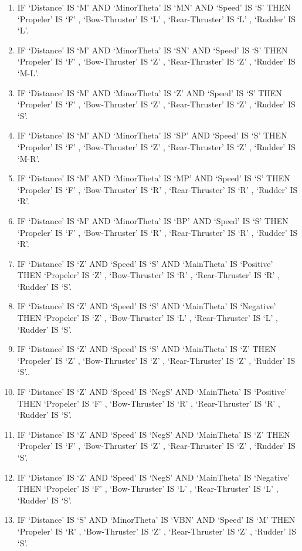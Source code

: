 \begin{enumerate}
\item	IF ‘Distance’ IS  ‘M’  AND  ‘MinorTheta’ IS ‘MN’   AND ‘Speed’ IS ‘S’  THEN ‘Propeler’ IS ‘F’  ,  ‘Bow-Thruster’ IS ‘L’ ,  ‘Rear-Thruster’ IS  ‘L’ ,  ‘Rudder’ IS ‘L’.
\item	IF ‘Distance’ IS  ‘M’  AND  ‘MinorTheta’ IS ‘SN’   AND ‘Speed’ IS ‘S’  THEN ‘Propeler’ IS ‘F’  ,  ‘Bow-Thruster’ IS ‘Z’ ,  ‘Rear-Thruster’ IS  ‘Z’ ,  ‘Rudder’ IS ‘M-L’.
\item	IF ‘Distance’ IS  ‘M’  AND  ‘MinorTheta’ IS ‘Z’   AND ‘Speed’ IS ‘S’  THEN ‘Propeler’ IS ‘F’  ,  ‘Bow-Thruster’ IS ‘Z’ ,  ‘Rear-Thruster’ IS  ‘Z’ ,  ‘Rudder’ IS ‘S’.
\item	IF ‘Distance’ IS  ‘M’  AND  ‘MinorTheta’ IS ‘SP’   AND ‘Speed’ IS ‘S’  THEN ‘Propeler’ IS ‘F’  ,  ‘Bow-Thruster’ IS ‘Z’ ,  ‘Rear-Thruster’ IS  ‘Z’ ,  ‘Rudder’ IS ‘M-R’.
\item	IF ‘Distance’ IS  ‘M’  AND  ‘MinorTheta’ IS ‘MP’   AND ‘Speed’ IS ‘S’  THEN ‘Propeler’ IS ‘F’  ,  ‘Bow-Thruster’ IS ‘R’ ,  ‘Rear-Thruster’ IS  ‘R’ ,  ‘Rudder’ IS ‘R’.
\item	IF ‘Distance’ IS  ‘M’  AND  ‘MinorTheta’ IS ‘BP’   AND ‘Speed’ IS ‘S’  THEN ‘Propeler’ IS ‘F’  ,  ‘Bow-Thruster’ IS ‘R’ ,  ‘Rear-Thruster’ IS  ‘R’ ,  ‘Rudder’ IS ‘R’.
\item	IF ‘Distance’ IS  ‘Z’   AND ‘Speed’ IS ‘S’  AND ‘MainTheta’ IS ‘Positive’ THEN ‘Propeler’ IS ‘Z’ ,  ‘Bow-Thruster’ IS ‘R’  ,  ‘Rear-Thruster’ IS  ‘R’  ,  ‘Rudder’ IS ‘S’.
\item	IF ‘Distance’ IS ‘Z’   AND ‘Speed’ IS ‘S’  AND ‘MainTheta’ IS ‘Negative’  THEN ‘Propeler’ IS ‘Z’ ,  ‘Bow-Thruster’ IS ‘L’  ,  ‘Rear-Thruster’ IS  ‘L’  ,  ‘Rudder’ IS ‘S’.
\item	IF ‘Distance’ IS ‘Z’   AND ‘Speed’ IS ‘S’  AND ‘MainTheta’ IS ‘Z’  THEN ‘Propeler’ IS ‘Z’ ,  ‘Bow-Thruster’ IS ‘Z’  ,  ‘Rear-Thruster’ IS  ‘Z’  ,  ‘Rudder’ IS ‘S’..
\item	IF ‘Distance’ IS ‘Z’   AND ‘Speed’ IS ‘NegS’  AND ‘MainTheta’ IS ‘Positive’  THEN ‘Propeler’ IS ‘F’ ,  ‘Bow-Thruster’ IS ‘R’  ,  ‘Rear-Thruster’ IS  ‘R’  ,  ‘Rudder’ IS ‘S’.
\item	IF ‘Distance’ IS ‘Z’   AND ‘Speed’ IS ‘NegS’   AND ‘MainTheta’ IS ‘Z’  THEN ‘Propeler’ IS ‘F’ ,  ‘Bow-Thruster’ IS ‘Z’  ,  ‘Rear-Thruster’ IS  ‘Z’  ,  ‘Rudder’ IS ‘S’. 
\item	IF ‘Distance’ IS ‘Z’   AND ‘Speed’ IS ‘NegS’   AND ‘MainTheta’ IS ‘Negative’  THEN ‘Propeler’ IS ‘F’ ,  ‘Bow-Thruster’ IS ‘L’  ,  ‘Rear-Thruster’ IS  ‘L’  ,  ‘Rudder’ IS ‘S’. 
\item	IF ‘Distance’ IS ‘S’   AND ‘MinorTheta’ IS ‘VBN’  AND ‘Speed’ IS ‘M’   THEN  ‘Propeler’ IS ‘R’ ,  ‘Bow-Thruster’ IS ‘Z’  ,  ‘Rear-Thruster’ IS  ‘Z’  ,  ‘Rudder’ IS ‘S’. 

\end{enumerate}
